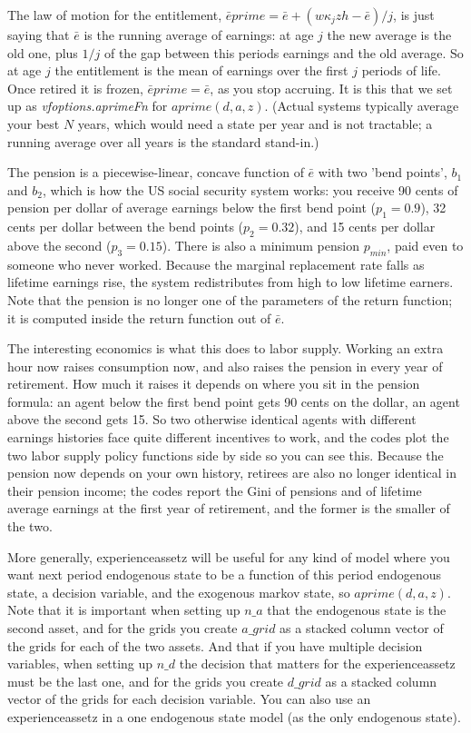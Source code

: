 The law of motion for the entitlement, $\bar{e}prime=\bar{e}+(w \kappa_j z h - \bar{e})/j$, is just saying that $\bar{e}$ is the running average of earnings: at age $j$ the new average is the old one, plus $1/j$ of the gap between this periods earnings and the old average. So at age $j$ the entitlement is the mean of earnings over the first $j$ periods of life. Once retired it is frozen, $\bar{e}prime=\bar{e}$, as you stop accruing. It is this that we set up as \textit{vfoptions.aprimeFn} for $aprime(d,a,z)$. (Actual systems typically average your best $N$ years, which would need a state per year and is not tractable; a running average over all years is the standard stand-in.)

The pension is a piecewise-linear, concave function of $\bar{e}$ with two 'bend points', $b_1$ and $b_2$, which is how the US social security system works: you receive 90 cents of pension per dollar of average earnings below the first bend point ($p_1=0.9$), 32 cents per dollar between the bend points ($p_2=0.32$), and 15 cents per dollar above the second ($p_3=0.15$). There is also a minimum pension $p_{min}$, paid even to someone who never worked. Because the marginal replacement rate falls as lifetime earnings rise, the system redistributes from high to low lifetime earners. Note that the pension is no longer one of the parameters of the return function; it is computed inside the return function out of $\bar{e}$.

The interesting economics is what this does to labor supply. Working an extra hour now raises consumption now, and also raises the pension in every year of retirement. How much it raises it depends on where you sit in the pension formula: an agent below the first bend point gets 90 cents on the dollar, an agent above the second gets 15. So two otherwise identical agents with different earnings histories face quite different incentives to work, and the codes plot the two labor supply policy functions side by side so you can see this. Because the pension now depends on your own history, retirees are also no longer identical in their pension income; the codes report the Gini of pensions and of lifetime average earnings at the first year of retirement, and the former is the smaller of the two.

More generally, experienceassetz will be useful for any kind of model where you want next period endogenous state to be a function of this period endogenous state, a decision variable, and the exogenous markov state, so $aprime(d,a,z)$. Note that it is important when setting up $n\_{}a$ that the endogenous state is the second asset, and for the grids you create $a\_{}grid$ as a stacked column vector of the grids for each of the two assets. And that if you have multiple decision variables, when setting up $n\_{}d$ the decision that matters for the experienceassetz must be the last one, and for the grids you create $d\_{}grid$ as a stacked column vector of the grids for each decision variable. You can also use an experienceassetz in a one endogenous state model (as the only endogenous state).

